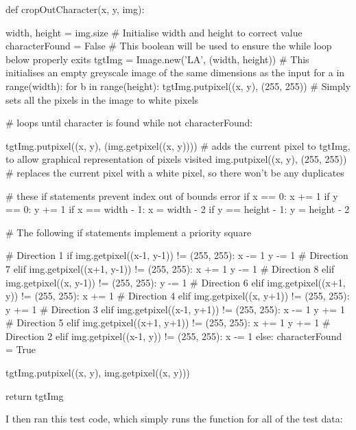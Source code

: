 \documentclass{report}
\begin{document}
\begin{python}
def cropOutCharacter(x, y, img):
    
    width, height = img.size  # Initialise width and height to correct value
    characterFound = False  # This boolean will be used to ensure the while loop below properly exits
    tgtImg = Image.new('LA', (width, height))  # This initialises an empty greyscale image of the same dimensions as the input
    for a in range(width):
        for b in range(height):
            tgtImg.putpixel((x, y), (255, 255))  # Simply sets all the pixels in the image to white pixels
    
    # loops until character is found
    while not characterFound:

        tgtImg.putpixel((x, y), (img.getpixel((x, y))))  # adds the current pixel to tgtImg, to allow graphical representation of pixels visited
        img.putpixel((x, y), (255, 255))  # replaces the current pixel with a white pixel, so there won't be any duplicates

        #  these if statements prevent index out of bounds error
        if x == 0:
            x += 1
        if y == 0:
            y += 1
        if x == width - 1:
            x = width - 2
        if y == height - 1:
            y = height - 2
        
        # The following if statements implement a priority square
        
        # Direction 1
        if img.getpixel((x-1, y-1)) != (255, 255):
            x -= 1
            y -= 1
        # Direction 7
        elif img.getpixel((x+1, y-1)) != (255, 255):
            x += 1
            y -= 1
        # Direction 8
        elif img.getpixel((x, y-1)) != (255, 255):
            y -= 1
        # Direction 6
        elif img.getpixel((x+1, y)) != (255, 255):
            x += 1
        # Direction 4
        elif img.getpixel((x, y+1)) != (255, 255):
            y += 1
        # Direction 3
        elif img.getpixel((x-1, y+1)) != (255, 255):
            x -= 1
            y += 1
        # Direction 5
        elif img.getpixel((x+1, y+1)) != (255, 255):
            x += 1
            y += 1
        # Direction 2
        elif img.getpixel((x-1, y)) != (255, 255):
            x -= 1
        else:
            characterFound = True

    tgtImg.putpixel((x, y), img.getpixel((x, y)))

    return tgtImg
\end{python}
I then ran this test code, which simply runs the function for all of the test data:
\end{document}
